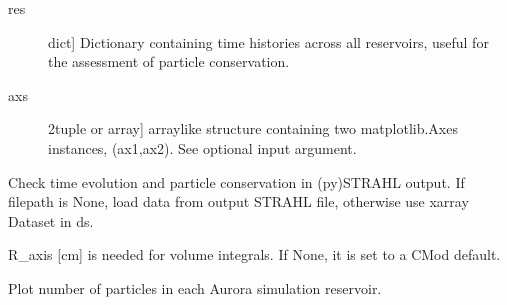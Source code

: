 \documentclass[letterpaper,10pt,english]{sphinxmanual}
\begin{document}
\begin{fulllineitems}
\begin{description}
\begin{description}
\item[{res}] \leavevmode{[}dict{]}
Dictionary containing time histories across all reservoirs, useful for 
the assessment of particle conservation.

\item[{axs}] \leavevmode{[}2\sphinxhyphen{}tuple or array{]}
array\sphinxhyphen{}like structure containing two matplotlib.Axes instances, (ax1,ax2).
See optional input argument.

\end{description}

\end{description}

\end{fulllineitems}


\begin{fulllineitems}
\label{\detokenize{aurora:aurora.particle_conserv.get_particle_nums}}
Check time evolution and particle conservation in (py)STRAHL output.
If filepath is None, load data from output STRAHL file, otherwise use xarray Dataset in ds.

R\_axis {[}cm{]} is needed for volume integrals. If None, it is set to a C\sphinxhyphen{}Mod default.

\end{fulllineitems}


\begin{fulllineitems}
\label{\detokenize{aurora:aurora.particle_conserv.plot_particle_conserv}}
Plot number of particles in each Aurora simulation reservoir.

\end{fulllineitems}
\end{document}
